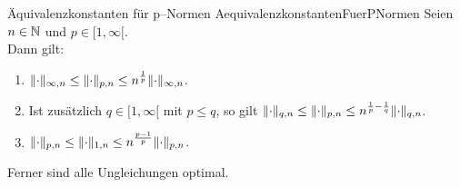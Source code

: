 \begin{lemma}{Äquivalenzkonstanten für p--Normen}
             {AequivalenzkonstantenFuerPNormen}
Seien $n \in \mathbb{N}$ und $p \in [1, \infty[$.\\
Dann gilt:
\begin{enumerate}[(1)]
\item\label{AequivalenzkonstantenFuerPNormen2}
 $\lVert\cdot\rVert_{\infty, n} \le \lVert\cdot\rVert_{p, n} 
     \le n^{\frac 1 p}\lVert\cdot\rVert_{\infty, n}$.
\item\label{AequivalenzkonstantenFuerPNormen3}
 Ist zusätzlich $q \in [1, \infty[$ mit $p \le q$, so gilt
$\lVert\cdot\rVert_{q,n}\le\lVert\cdot\rVert_{p,n}\le n^{\frac 1p-\frac 1q}\lVert\cdot\rVert_{q,n}$.
\item\label{AequivalenzkonstantenFuerPNormen1}
 $\lVert\cdot\rVert_{p,n}\le\lVert\cdot\rVert_{1, n}\le n^{\frac{p-1}p}\lVert\cdot\rVert_{p,n}$.
\end{enumerate}
Ferner sind alle Ungleichungen optimal.
\end{lemma}
